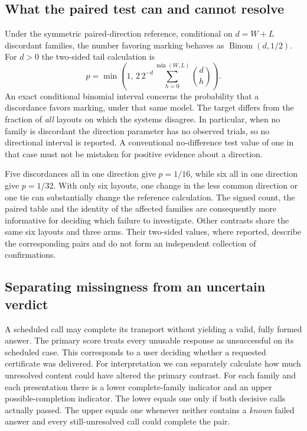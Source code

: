\documentclass[12pt,letterpaper]{article}
\begin{document}
\subsection{What the paired test can and cannot resolve}

Under the symmetric paired-direction reference, conditional on $d=W+L$ discordant families, the number favoring marking behaves as $\operatorname{Binom}(d,1/2)$. For $d>0$ the two-sided tail calculation is
\[
 p=\min\!\left(1,\,2\,2^{-d}\sum_{h=0}^{\min(W,L)}\binom{d}{h}\right).
\]
An exact conditional binomial interval concerns the probability that a discordance favors marking, under that same model. The target differs from the fraction of \emph{all} layouts on which the systems disagree. In particular, when no family is discordant the direction parameter has no observed trials, so no directional interval is reported. A conventional no-difference test value of one in that case must not be mistaken for positive evidence about a direction.

Five discordances all in one direction give $p=1/16$, while six all in one direction give $p=1/32$. With only six layouts, one change in the less common direction or one tie can substantially change the reference calculation. The signed count, the paired table and the identity of the affected families are consequently more informative for deciding which failure to investigate. Other contrasts share the same six layouts and three arms. Their two-sided values, where reported, describe the corresponding pairs and do not form an independent collection of confirmations.

\subsection{Separating missingness from an uncertain verdict}

A scheduled call may complete its transport without yielding a valid, fully formed answer. The primary score treats every unusable response as unsuccessful on its scheduled case. This corresponds to a user deciding whether a requested certificate was delivered. For interpretation we can separately calculate how much unresolved content could have altered the primary contrast. For each family and each presentation there is a lower complete-family indicator and an upper possible-completion indicator. The lower equals one only if both decisive calls actually passed. The upper equals one whenever neither contains a \emph{known} failed answer and every still-unresolved call could complete the pair.
\end{document}

